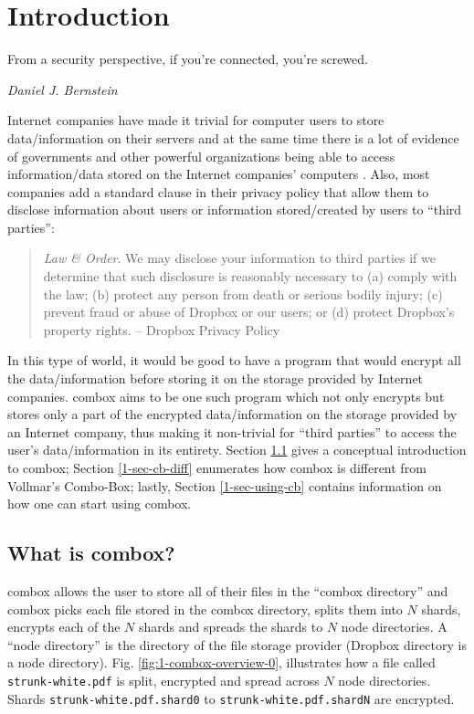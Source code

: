 \chapter{Introduction}

\epigraph{From a security perspective, if you're connected, you're
  screwed.}{\textit{Daniel J. Bernstein}}

Internet companies have made it trivial for computer users to store
data/information on their servers and at the same time there is a lot
of evidence of governments and other powerful organizations being able
to access information/data stored on the Internet companies' computers
\cite{website:wikileaks-spyfiles}. Also, most companies add a standard
clause in their privacy policy that allow them to disclose information
about users or information stored/created by users to ``third
parties'':

\begin{quote}
  \emph{Law \& Order}. We may disclose your information to third
  parties if we determine that such disclosure is reasonably necessary
  to (a) comply with the law; (b) protect any person from death or
  serious bodily injury; (c) prevent fraud or abuse of Dropbox or our
  users; or (d) protect Dropbox's property rights. -- Dropbox Privacy
  Policy \cite{website:dropbox-privacy}
\end{quote}

In this type of world, it would be good to have a program that would
encrypt all the data/information before storing it on the storage
provided by Internet companies. combox aims to be one such program
which not only encrypts but stores only a part of the encrypted
data/information on the storage provided by an Internet company, thus
making it non-trivial for ``third parties'' to access the user's
data/information in its entirety. Section \ref{1-sec-cb} gives a
conceptual introduction to combox; Section \ref{1-sec-cb-diff}
enumerates how combox is different from Vollmar's Combo-Box; lastly,
Section \ref{1-sec-using-cb} contains information on how one can start
using combox.

\section{What is combox?}\label{1-sec-cb}

combox allows the user to store all of their files in the ``combox
directory'' and combox picks each file stored in the combox directory,
splits them into $N$ shards, encrypts each of the $N$ shards and
spreads the shards to $N$ node directories. A ``node directory'' is
the directory of the file storage provider (Dropbox directory is a
node directory). Fig. \ref{fig:1-combox-overview-0}, illustrates how a
file called \verb+strunk-white.pdf+ is split, encrypted and spread
across $N$ node directories. Shards \verb+strunk-white.pdf.shard0+ to
\verb+strunk-white.pdf.shardN+ are encrypted.

